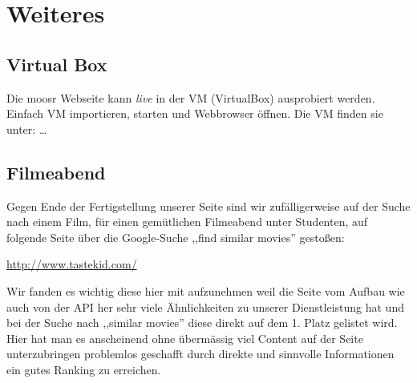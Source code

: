 \chapter{Weiteres}

\section{Virtual Box}
Die moosr Webseite kann \emph{live} in der VM (VirtualBox) ausprobiert werden.
Einfach VM importieren, starten und Webbrowser öffnen.
Die VM finden sie unter:
\dots

\section{Filmeabend}
Gegen Ende der Fertigstellung unserer Seite sind wir zufälligerweise auf der
Suche nach einem Film, für einen gemütlichen Filmeabend unter Studenten, auf folgende
Seite über die Google-Suche ,,find similar movies'' gestoßen:
\begin{center}
    \url{http://www.tastekid.com/}
\end{center}
Wir fanden es wichtig diese hier mit aufzunehmen weil die Seite vom Aufbau wie
auch von der API her sehr viele Ähnlichkeiten zu unserer Dienstleistung hat und
bei der Suche nach ,,similar movies'' diese direkt auf dem 1. Platz gelistet
wird. Hier hat man es anscheinend ohne übermässig viel Content auf der Seite
unterzubringen problemlos geschafft durch direkte und sinnvolle Informationen
ein gutes Ranking zu erreichen.



